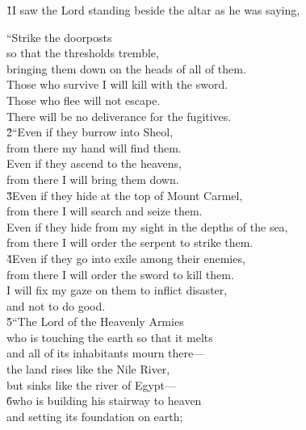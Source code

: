 \v{1}I saw the Lord standing beside the altar as he was saying,

\begin{poetry}
\poeml ``Strike the doorposts \\
\poemll    so that the thresholds tremble, \\
\poemlll       bringing them down on the heads of all of them. \\
\poeml Those who survive I will kill with the sword. \\
\poemll    Those who flee will not escape. \\
\poemlll       There will be no deliverance for the fugitives. \\
\poeml \v{2}``Even if they burrow into Sheol, \\
\poemll    from there my hand will find them. \\
\poeml Even if they ascend to the heavens, \\
\poemll    from there I will bring them down. \\
\poeml \v{3}Even if they hide at the top of Mount Carmel, \\
\poemll    from there I will search and seize them. \\
\poeml Even if they hide from my sight in the depths of the sea, \\
\poemll    from there I will order the serpent to strike them. \\
\poeml \v{4}Even if they go into exile among their enemies, \\
\poemll    from there I will order the sword to kill them. \\
\poeml I will fix my gaze on them to inflict disaster, \\
\poemll    and not to do good. \\
\poeml \v{5}``The Lord  of the Heavenly Armies \\
\poeml who is touching the earth so that it melts \\
\poemll    and all of its inhabitants mourn there--- \\
\poemlll       the land rises like the Nile River, \\
\poemlll       but sinks like the river of Egypt--- \\
\poeml \v{6}who is building his stairway to heaven \\
\poemll    and setting its foundation on earth; \\

\end{poetry}
